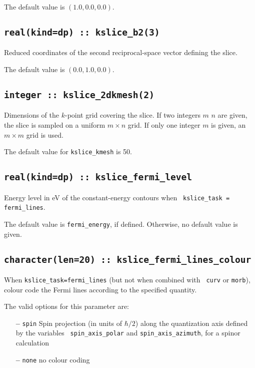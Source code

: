 The default value is $(1.0,0.0,0.0)$.

\subsection[kslice\_corner]{\tt real(kind=dp) :: kslice\_b2(3)}
Reduced coordinates of the second reciprocal-space vector 
defining the slice.

The default value is $(0.0,1.0,0.0)$.

\subsection[kslice\_num\_points]{\tt integer :: kslice\_2dkmesh(2)}

Dimensions of the $k$-point grid covering the slice.
If two integers $m$ $n$ are given, the slice is sampled on a uniform
$m\times n$ grid.  If only one integer $m$ is given, an $m\times m$
grid is used.

The default value for \verb#kslice_kmesh# is 50.


\subsection[kslice\_cntr\_energy]{\tt real(kind=dp) :: kslice\_fermi\_level}

Energy level in eV of the constant-energy contours when {\tt
  kslice\_task = fermi\_lines}.

The default value is {\tt fermi\_energy}, if defined. Otherwise, no
default value is given.


\subsection[kpath\_colour]{\tt character(len=20) ::
  kslice\_fermi\_lines\_colour}
When {\tt kslice\_task=fermi\_lines} (but not when combined with {\tt
  curv} or {\tt morb}), colour code the Fermi lines according to the
specified quantity.

The valid options for this parameter are:
\begin{itemize}
\item[{\bf --}] \verb#spin# Spin projection (in units of $\hbar/2$)
  along the quantization axis defined by the variables {\tt
    spin\_axis\_polar} and {\tt spin\_axis\_azimuth}, for a spinor
  calculation
\item[{\bf --}]  \verb#none# no colour coding
\end{itemize}

